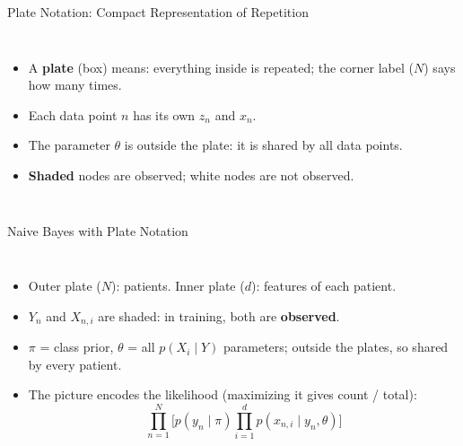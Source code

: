 \documentclass[aspectratio=169]{beamer}
\begin{document}
\begin{frame}{Plate Notation: Compact Representation of Repetition}
\begin{columns}[c]
\centering
{}
\begin{itemize}
  \item A \textbf{plate} (box) means: everything inside is repeated; the corner label ($N$) says how many times.
  \item Each data point $n$ has its own $z_n$ and $x_n$.
  \item The parameter $\theta$ is outside the plate: it is shared by all data points.
  \item \textbf{Shaded} nodes are observed; white nodes are not observed.
\end{itemize}
\end{columns}
\end{frame}

\begin{frame}{Naive Bayes with Plate Notation}
\begin{columns}[c]
\centering
{}
\begin{itemize}
  \item Outer plate ($N$): patients. Inner plate ($d$): features of each patient.
  \item $Y_n$ and $X_{n,i}$ are shaded: in training, both are \textbf{observed}.
  \item $\pi$ = class prior, $\theta$ = all $p(X_i\mid Y)$ parameters; outside the plates, so shared by every patient.
  \item The picture encodes the likelihood (maximizing it gives count / total):
  \[
    \prod_{n=1}^{N}\Big[p(y_n\mid\pi)\prod_{i=1}^{d} p(x_{n,i}\mid y_n,\theta)\Big]
  \]
\end{itemize}
\end{columns}
\end{frame}
\end{document}
